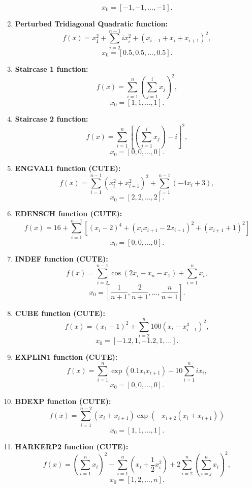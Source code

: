 \begin{enumerate}
    \[
    x_0 = [-1, -1, \ldots, -1].
    \]

    \item \textbf{Perturbed Tridiagonal Quadratic function:}
    \[
    f(x) = x_1^2 + \sum_{i=2}^{n-1} i x_i^2 + (x_{i-1} +  x_i + x_{i+1})^2,
    \]
    \[
    x_0 = [0.5, 0.5, \dots, 0.5].
    \]

    \item \textbf{Staircase 1 function:}
    \[
    f(x) = \sum_{i=1}^{n} \left( \sum_{j=1}^{i} x_j \right)^2,
    \]
    \[
    x_0 = [1, 1, \dots, 1].
    \]

    \item \textbf{Staircase 2 function:}
    \[
    f(x) = \sum_{i=1}^{n}\left[\left( \sum_{j=1}^{i}  x_j\right) - i \right]^2,
    \]
    \[
    x_0 = [0, 0, \dots, 0].
    \]

    \item \textbf{ENGVAL1 function (CUTE):}
    \[
    f(x) = \sum_{i=1}^{n-1} \left( x_i^2 + x_{i+1}^2\right)^2 + \sum_{i=1}^{n-1} \left( -4 x_i + 3 \right),
    \]
    \[
    x_0 = [2, 2, \dots, 2].
    \]


    \item \textbf{EDENSCH function (CUTE):}
    \[
    f(x) = 16 + \sum_{i=1}^{n-1} \left[ (x_i - 2)^4 + (x_i x_{i+1} - 2x_{i+1})^2 + (x_{i+1} + 1)^2\right]
    \]
    \[
    x_0 = [0, 0, \dots, 0].
    \]

    \item \textbf{INDEF function (CUTE):}
    \[
    f(x) = \sum_{i=2}^{n-1} \cos(2x_i - x_n - x_1) + \sum_{i=1}^{n} x_i,
    \]
    \[
    x_0 = \left[ \frac{1}{n+1}, \frac{2}{n+1}, \dots, \frac{n}{n+1} \right].
    \]

    \item \textbf{CUBE function (CUTE):}
    \[
    f(x) = (x_1 - 1)^2 + \sum_{i=2}^{n} 100 \left( x_i - x_{i-1}^3 \right)^2,
    \]
    \[
    x_0 = [-1.2, 1, -1.2, 1, \dots].
    \]

    \item \textbf{EXPLIN1 function (CUTE):}
    \[
    f(x) = \sum_{i=1}^{n} \exp(0.1 x_ix_{i+1}) - 10\sum_{i=1}^n ix_i,
    \]
    \[
    x_0 = [0, 0, \dots, 0].
    \]

    \item \textbf{BDEXP function (CUTE):}
    \[
    f(x) = \sum_{i=1}^{n-2} (x_i + x_{i+1}) \exp(-x_{i+2}(x_i + x_{i+1}))
    \]
    \[
    x_0 = [1, 1, \dots, 1].
    \]

    \item \textbf{HARKERP2 function (CUTE):}
    \[
    f(x) = \left(\sum_{i=1}^{n} x_i \right)^2 - \sum_{i=1}^{n} ( x_i + \frac{1}{2} x_i^2 ) + 2 \sum_{i=2}^{n} \left(\sum_{i=j}^n x_i \right)^2,
    \]
    \[
    x_0 = \left[ 1, 2, ..., n \right].
    \]


\end{enumerate}
